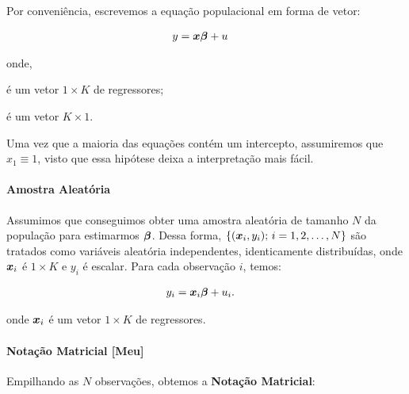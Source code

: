 \documentclass[11pt, oneside, a4paper, article]{article}
\numberwithin{equation}{section}
\begin{document}
Por conveniência, escrevemos a equação populacional em forma de vetor:

\vspace{-1 em}
\begin{align} \label{ols:mod:vec}
	y &= \boldsymbol{x} \boldsymbol{\beta} + u
\end{align}

\noindent
onde,

\vspace{-1 em}
\begin{description}[noitemsep]
\item [$\mbs{x} \equiv (x_{1}, \dots, x_{K})$] é um vetor $1 \times K$ de regressores;

\item [$\mbs{\beta} \equiv (\beta_{1}, \dots, \beta_{K})'$] é um vetor $K \times 1$.
\end{description}

\noindent
Uma vez que a maioria das equações contém um intercepto, assumiremos que $x_{1} \equiv 1$, visto que essa hipótese deixa a interpretação mais fácil.

\paragraph{Amostra Aleatória} 

Assumimos que conseguimos obter uma amostra aleatória de tamanho $N$ da população para estimarmos $\boldsymbol{\beta}$.
Dessa forma, $\{ (\boldsymbol{x}_{i}, y_{i}); \, i = 1, 2, \dots, N \}$
são tratados como variáveis aleatória independentes, identicamente distribuídas, onde
$\boldsymbol{x}_{i}$ é $1 \times K$ e $y_{i}$ é escalar.
Para cada observação $i$, temos:

\vspace{-1 em}
\begin{align} \label{ols:mod:vec:i}
	y_{i} &= \boldsymbol{x}_{i} \boldsymbol{\beta} + u_{i}.
\end{align}

\noindent
onde
$\boldsymbol{x}_{i}$
é um vetor $1 \times K$ de regressores.

\paragraph{Notação Matricial [Meu]}
Empilhando as $N$ observações, obtemos a \textbf{Notação Matricial}:
\end{document}

